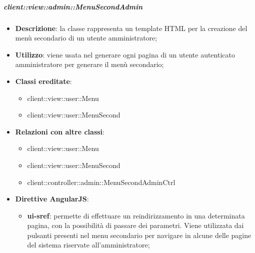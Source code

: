 		\subparagraph{client::view::admin::MenuSecondAdmin} %
		\label{subp:bdsm_app_client_view_admin_menusecondadmin}

			\begin{itemize}
				\item \textbf{Descrizione}: la classe rappresenta un template HTML per la creazione del menù secondario di un utente amministratore;
				\item \textbf{Utilizzo}: viene usata nel generare ogni pagina di un utente autenticato amministratore per generare il menù secondario;
				\item \textbf{Classi ereditate}:
					\begin{itemize}
						\item client::view::user::Menu
						\item client::view::user::MenuSecond
					\end{itemize}
				\item \textbf{Relazioni con altre classi}:
					\begin{itemize}
						\item client::view::user::Menu
						\item client::view::user::MenuSecond
						\item client::controller::admin::MenuSecondAdminCtrl
					\end{itemize}
				\item \textbf{Direttive AngularJS}:
					\begin{itemize}
						\item \textbf{ui-sref}: permette di effettuare un reindirizzamento in una determinata pagina, con la possibilità di passare dei parametri. Viene utilizzata dai pulsanti presenti nel menu secondario per navigare in alcune delle pagine del sistema riservate all'amministratore;
					\end{itemize}
			\end{itemize}


